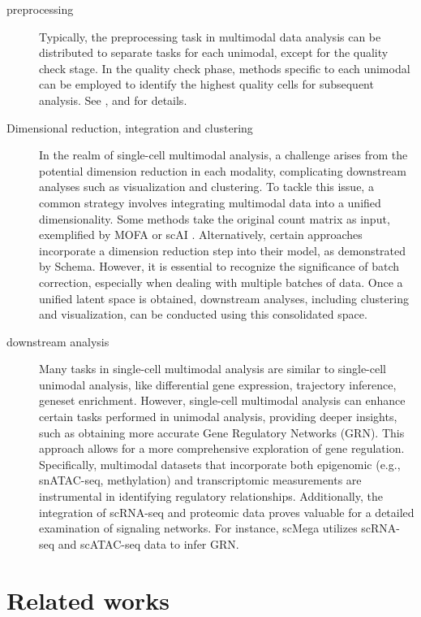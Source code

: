 \begin{description}
	\item[preprocessing]
	Typically, the preprocessing task in multimodal data analysis can be distributed to separate tasks for each unimodal, except for the quality check stage. In the quality check phase, methods specific to each unimodal can be employed to identify the highest quality cells for subsequent analysis. See ,  and  for details.

	\item[Dimensional reduction, integration and clustering]
	In the realm of single-cell multimodal analysis, a challenge arises from the potential dimension reduction in each modality, complicating downstream analyses such as visualization and clustering. To tackle this issue, a common strategy involves integrating multimodal data into a unified dimensionality. Some methods take the original count matrix as input, exemplified by MOFA \citep{argelaguet2020mofa+} or scAI \citep{jin2020scai}. Alternatively, certain approaches incorporate a dimension reduction step into their model, as demonstrated by Schema\citep{singh2021schema}. However, it is essential to recognize the significance of batch correction, especially when dealing with multiple batches of data. Once a unified latent space is obtained, downstream analyses, including clustering and visualization, can be conducted using this consolidated space.

	\item[downstream analysis]
	Many tasks in single-cell multimodal analysis are similar to single-cell unimodal analysis, like differential gene expression, trajectory inference, geneset enrichment. However, single-cell multimodal analysis can enhance certain tasks performed in unimodal analysis, providing deeper insights, such as obtaining more accurate Gene Regulatory Networks (GRN). This approach allows for a more comprehensive exploration of gene regulation. Specifically, multimodal datasets that incorporate both epigenomic (e.g., snATAC-seq, methylation) and transcriptomic measurements are instrumental in identifying regulatory relationships. Additionally, the integration of scRNA-seq and proteomic data proves valuable for a detailed examination of signaling networks. For instance, scMega \citep{li2023scmega} utilizes scRNA-seq and scATAC-seq data to infer GRN.
\end{description}

\section{Related works}
\label{background:related_works}
